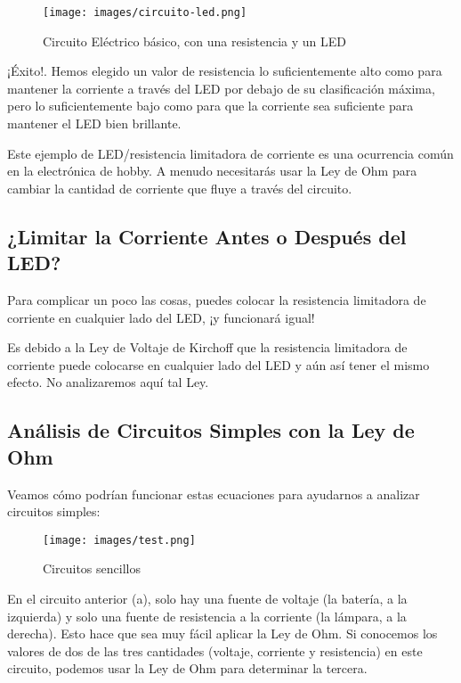 \documentclass[output=paper, 
colorlinks,
citecolor=brown,
newtxmath
]{langscibook}
\begin{document}
 
\begin{figure}[H]
\texttt{[image: images/circuito-led.png]}
\caption{Circuito Eléctrico básico, con una resistencia y un LED}
\label{fig:unidades}
\end{figure}



¡Éxito!. Hemos elegido un valor de resistencia lo suficientemente alto como para mantener la corriente a través del LED por debajo de su clasificación máxima, pero lo suficientemente bajo como para que la corriente sea suficiente para mantener el LED bien brillante.

Este ejemplo de LED/resistencia limitadora de corriente es una ocurrencia común en la electrónica de hobby. A menudo necesitarás usar la Ley de Ohm para cambiar la cantidad de corriente que fluye a través del circuito. 

\subsection{¿Limitar la Corriente Antes o Después del LED?}

Para complicar un poco las cosas, puedes colocar la resistencia limitadora de corriente en cualquier lado del LED, ¡y funcionará igual!

Es debido a la Ley de Voltaje de Kirchoff que la resistencia limitadora de corriente puede colocarse en cualquier lado del LED y aún así tener el mismo efecto. No analizaremos aquí tal Ley.

\subsection{Análisis de Circuitos Simples con la Ley de Ohm}
Veamos cómo podrían funcionar estas ecuaciones para ayudarnos a analizar circuitos simples:

\begin{figure}[H]
\texttt{[image: images/test.png]}
\caption{Circuitos sencillos}
\label{fig:unidades}
\end{figure}


En el circuito anterior (a), solo hay una fuente de voltaje (la batería, a la izquierda) y solo una fuente de resistencia a la corriente (la lámpara, a la derecha). Esto hace que sea muy fácil aplicar la Ley de Ohm. Si conocemos los valores de dos de las tres cantidades (voltaje, corriente y resistencia) en este circuito, podemos usar la Ley de Ohm para determinar la tercera.
\end{document}

